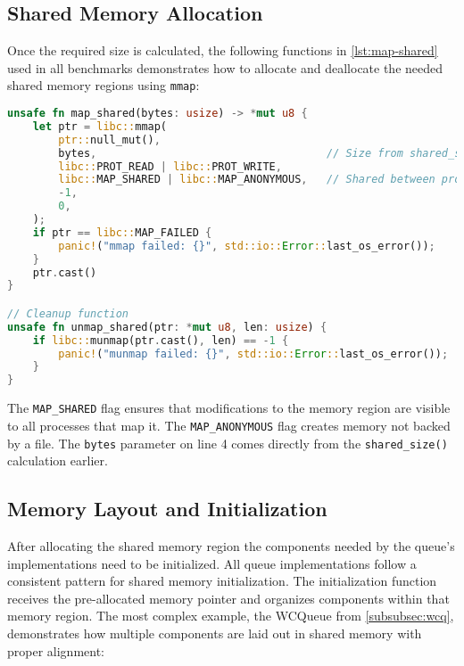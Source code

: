 \subsection{Shared Memory Allocation}

Once the required size is calculated, the following functions in \cref{lst:map-shared} used in all benchmarks demonstrates how to allocate and deallocate the needed shared memory regions using \texttt{mmap}:

\begin{lstlisting}[language=Rust, style=boxed, caption={Shared memory allocation using mmap}, label={lst:map-shared}]
unsafe fn map_shared(bytes: usize) -> *mut u8 {
    let ptr = libc::mmap(
        ptr::null_mut(),
        bytes,                                    // Size from shared_size()
        libc::PROT_READ | libc::PROT_WRITE,
        libc::MAP_SHARED | libc::MAP_ANONYMOUS,   // Shared between processes
        -1,
        0,
    );
    if ptr == libc::MAP_FAILED {
        panic!("mmap failed: {}", std::io::Error::last_os_error());
    }
    ptr.cast()
}

// Cleanup function
unsafe fn unmap_shared(ptr: *mut u8, len: usize) {
    if libc::munmap(ptr.cast(), len) == -1 {
        panic!("munmap failed: {}", std::io::Error::last_os_error());
    }
}
\end{lstlisting}

The \texttt{MAP\_SHARED} flag ensures that modifications to the memory region are visible to all processes that map it. The \texttt{MAP\_ANONYMOUS} flag creates memory not backed by a file. The \texttt{bytes} parameter on line 4 comes directly from the \texttt{shared\_size()} calculation earlier.

\subsection{Memory Layout and Initialization}

After allocating the shared memory region the components needed by the queue's implementations need to be initialized. All queue implementations follow a consistent pattern for shared memory initialization. The initialization function receives the pre-allocated memory pointer and organizes components within that memory region. The most complex example, the WCQueue from \cref{subsubsec:wcq}, demonstrates how multiple components are laid out in shared memory with proper alignment:

